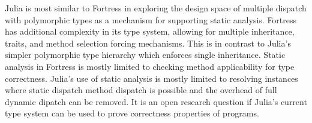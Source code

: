 Julia is most similar to Fortress in exploring the design space of multiple dispatch with polymorphic types as a mechanism for supporting static analysis. Fortress has additional complexity in its type system, allowing for multiple inheritance, traits, and method selection forcing mechanisms.  This is in contrast to Julia's simpler polymorphic type hierarchy which enforces single inheritance. Static analysis in Fortress is mostly limited to checking method applicability for type correctness.  Julia's use of static analysis is mostly limited to resolving instances where static dispatch method dispatch is possible and the overhead of full dynamic dipatch can be removed.  It is an open research question if Julia's current type system can be used to prove correctness properties of programs.  



